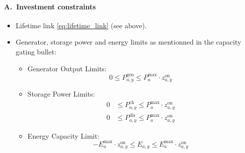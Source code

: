 \paragraph{A.~Investment constraints}
\begin{itemize}
  \item Lifetime link \eqref{eq:lifetime_link} (see above).
      \item Generator, storage power and energy limits as mentionned in the
        capacity gating bullet:
        \begin{itemize}
        \item Generator Output Limits:\\
            \begin{equation}
                  0 \leq P^{\text{gen}}_{a,y} 
                  \leq P^{\text{max}}_{a} \cdot z^{\text{on}}_{a,y}
            \end{equation}
    
        \item Storage Power Limits:\\
            \begin{equation}
                  \begin{aligned}
                        0 &\leq P^{\text{ch}}_{a,y} \leq P^{\text{max}}_{a} \cdot z^{\text{on}}_{a,y} \\
                        0 &\leq P^{\text{dis}}_{a,y} \leq P^{\text{max}}_{a} \cdot z^{\text{on}}_{a,y}
                  \end{aligned}
            \end{equation}
    
        \item Energy Capacity Limit:\\
            \begin{equation}
                  - E^{\text{max}}_{a} \cdot z^{\text{on}}_{a,y} \leq E_{a,y} \leq E^{\text{max}}_{a} \cdot z^{\text{on}}_{a,y}
            \end{equation}
      \end{itemize}
\end{itemize}

